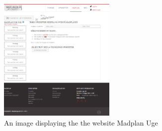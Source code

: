 \begin{figure}[H]
    \centering
    \includegraphics[width=0.5\textwidth]{Grafik/madplanuge}
    \caption{An image displaying the the website Madplan Uge}
    \label{MadPlanUge}
\end{figure}
